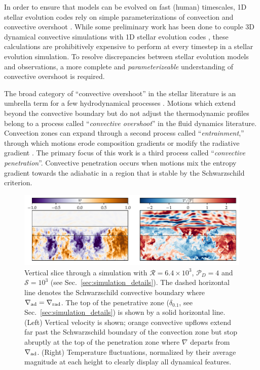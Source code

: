 \documentclass[twocolumn, linenumbers]{aastex631}
\newcommand{\gradrad}{\ensuremath{\nabla_{\rm{rad}}}}
\newcommand{\gradad}{\ensuremath{\nabla_{\rm{ad}}}}
\newcommand{\justgrad}{\ensuremath{\nabla}}
\newcommand{\mP}{\ensuremath{\mathcal{P}}}
\newcommand{\mR}{\ensuremath{\mathcal{R}}}
\newcommand{\mS}{\ensuremath{\mathcal{S}}}
\begin{document}
In order to ensure that models can be evolved on fast (human) timescales, 1D stellar evolution codes rely on simple parameterizations of convection \citep[e.g., mixing length theory,][]{bohm-vitense1958} and convective overshoot \citep{shaviv_salpeter_1973, maeder1975, herwig2000, paxton_etal_2011, paxton_etal_2013, paxton_etal_2018, paxton_etal_2019}.
While some preliminary work has been done to couple 3D dynamical convective simulations with 1D stellar evolution codes \citep{jorgensen_weiss_2019}, these calculations are prohibitively expensive to perform at every timestep in a stellar evolution simulation.
To resolve discrepancies between stellar evolution models and observations, a more complete and \emph{parameterizeable} understanding of convective overshoot is required.

The broad category of ``convective overshoot'' in the stellar literature is an umbrella term for a few hydrodynamical processes \citep{zahn1991, brummell_etal_2002, korre_etal_2019}.
Motions which extend beyond the convective boundary but do not adjust the thermodynamic profiles belong to a process called ``\emph{convective overshoot}'' in the fluid dynamics literature.
Convection zones can expand through a second process called ``\emph{entrainment},'' through which motions erode composition gradients or modify the radiative gradient \citep[][]{meakin_arnett_2007, viallet_etal_2013, cristini_etal_2017, jones_etal_2017, fuentes_cumming_2020, horst_etal_2021}.
The primary focus of this work is a third process called ``\emph{convective penetration}''.
Convective penetration occurs when motions mix the entropy gradient towards the adiabatic in a region that is stable by the Schwarzschild criterion.

\begin{figure}[t]
\centering
\includegraphics[width=\textwidth]{vertical_dynamics_panels.pdf}
\caption{
Vertical slice through a simulation with $\mR = 6.4 \times 10^3$, $\mP_D = 4$ and $\mS = 10^3$ (see Sec.~\ref{sec:simulation_details}).
The dashed horizontal line denotes the Schwarzschild convective boundary where $\gradad = \gradrad$.
The top of the penetrative zone ($\delta_{0.1}$, see Sec.~\ref{sec:simulation_details}) is shown by a solid horizontal line.
(Left) Vertical velocity is shown; orange convective upflows extend far past the Schwarzschild boundary of the convection zone but stop abruptly at the top of the penetration zone where $\justgrad$ departs from $\gradad$.
(Right) Temperature fluctuations, normalized by their average magnitude at each height to clearly display all dynamical features.
\label{fig:vertical_dynamics_panels}
}
\end{figure}
\end{document}
